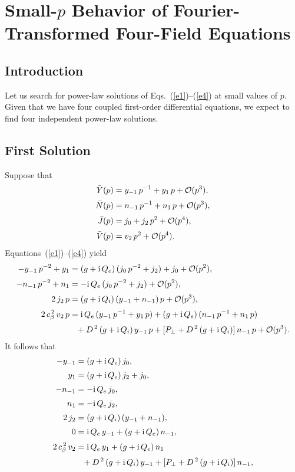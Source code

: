 \documentclass[12pt,prb,aps,notitlepage]{revtex4-1}
\begin{document}
\section{Small-$p$ Behavior of Fourier-Transformed Four-Field Equations}
\subsection{Introduction}
Let us search for power-law solutions of Eqs.~(\ref{e1})--(\ref{e4}) at small values of $p$. Given that we have four coupled first-order differential equations,
we expect to find four independent power-law solutions.

\subsection{First Solution}
Suppose that 
\begin{align}
\bar{Y}(p) &=y_{-1}\,p^{-1} + y_1\,p + {\cal O}(p^3),\\[0.5ex]
\bar{N}(p) &= n_{-1}\,p^{-1}+n_1\,p + {\cal O}(p^3),\\[0.5ex]
\bar{J}(p) &= j_0 + j_2\,p^2+ {\cal O}(p^4),\\[0.5ex]
\bar{V}(p) &= v_2\,p^2+ {\cal O}(p^4).
\end{align}
Equations~(\ref{e1})--(\ref{e4}) yield 
\begin{align}
-y_{-1}\,p^{-2} + y_1 &= (g+{\rm i}\,Q_e)\,(j_0\,p^{-2}+j_2) + j_0 + {\cal O}(p^2),\\[0.5ex]
-n_{-1}\,p^{-2} + n_1 &= -{\rm i}\,Q_e\,(j_0\,p^{-2}+j_2)+ {\cal O}(p^2),\\[0.5ex]
2\,j_2\,p &= (g+{\rm i}\,Q_i)\,(y_{-1}+n_{-1})\,p+ {\cal O}(p^3),\\[0.5ex]
2\,c_\beta^{\,2}\,v_2\,p &={\rm i}\,Q_e\,(y_{-1}\,p^{-1} +y_1\,p) + (g+{\rm i}\,Q_e)\,(n_{-1}\,p^{-1}+ n_1\,p)\nonumber\\[0.5ex]&\phantom{=}
+ D^{\,2}\,(g+{\rm i}\,Q_i)\,y_{-1}\,p + [P_\perp + D^{\,2}\,(g+{\rm i}\,Q_i)]\,n_{-1}\,p+ {\cal O}(p^3).
\end{align}
It follows that
\begin{align}
-y_{-1}&= (g+{\rm i}\,Q_e)\,j_0,\\[0.5ex]
y_1 &= (g+{\rm i}\,Q_e)\,j_2 + j_0,\\[0.5ex]
-n_{-1}&= -{\rm i}\,Q_e\,j_0,\\[0.5ex]
n_1 &= -{\rm i}\,Q_e\,j_2,\\[0.5ex]
2\,j_2 &= (g+{\rm i}\,Q_i)\,(y_{-1}+n_{-1}),\\[0.5ex]
0 &= {\rm i}\,Q_e\,y_{-1} + (g+{\rm i}\,Q_e)\,n_{-1},\\[0.5ex]
2\,c_\beta^{\,2}\,v_2 &= {\rm i}\,Q_e\,y_1 + (g+{\rm i}\,Q_e)\,n_1\nonumber\\[0.5ex]
&\phantom{=} + D^{\,2}\,(g+{\rm i}\,Q_i)\,y_{-1} + [P_\perp+ D^{\,2}\,(g+{\rm i}\,Q_i)]\,n_{-1},
\end{align}
\end{document}
